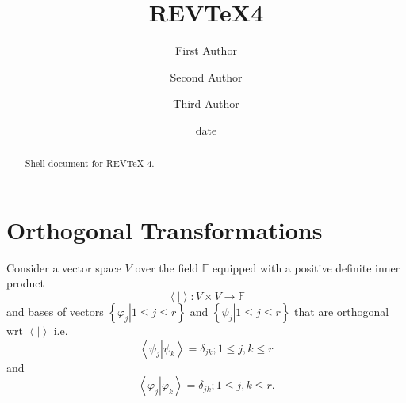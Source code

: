 \documentclass[aps,preprint]{revtex4}%
\begin{document}
\title[Short title for running header]{REV\TeX4}
\author{First Author}
\author{Second Author}
\author{Third Author}

\begin{abstract}
Shell document for REV\TeX{} 4.

\end{abstract}
\date[Date text]{date}




\maketitle
\tableofcontents


\section{Orthogonal Transformations }

Consider a vector space $V$ over the field $\mathbb{F}$ equipped with a
positive definite inner product%
\begin{equation}
\left\langle \left.  {}\right\vert \right\rangle :V\times V\rightarrow
\mathbb{F}%
\end{equation}
and bases of vectors $\left\{  \left.  \varphi_{j}\right\vert 1\leq j\leq
r\right\}  $ and $\left\{  \left.  \psi_{j}\right\vert 1\leq j\leq r\right\}
$ that are orthogonal wrt $\left\langle \left.  {}\right\vert \right\rangle $
i.e.
\begin{equation}
\left\langle \left.  \psi_{j}\right\vert \psi_{k}\right\rangle =\delta
_{jk};1\leq j,k\leq r
\end{equation}
and%
\begin{equation}
\left\langle \left.  \varphi_{j}\right\vert \varphi_{k}\right\rangle
=\delta_{jk};1\leq j,k\leq r.
\end{equation}
\end{document}
